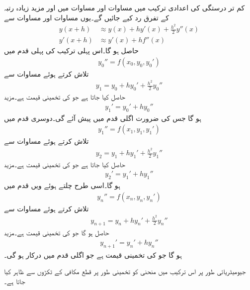 کم تر درستگی کی اعدادی ترکیب میں مساوات  اور مساوات  میں   اور مزید زیادہ رتبہ کے تفرق رد کیے جائیں گے۔یوں مساوات  اور مساوات  سے
\begin{align*}
y(x+h) & \approx y(x)+hy'(x)+\tfrac{h^2}{2}y''(x)\\
y'(x+h)&\approx y'(x)+hf''(x)
\end{align*}
حاصل ہو گا۔اس پہلی ترکیب کی پہلی قدم میں
\begin{align*}
y_0''=f(x_0,y_0,y_0')
\end{align*}
تلاش کرتے ہوئے  مساوات  سے
\begin{align*}
y_1=y_0+hy_0'+\tfrac{h^2}{2}y_0''
\end{align*}
حاصل کیا جاتا ہے جو  کی تخمینی قیمت ہے۔مزید
\begin{align*}
y_1'=y_0'+hy_0''
\end{align*}
ہو گا جس کی ضرورت اگلی قدم میں پیش آئے گی۔دوسری قدم میں
\begin{align*}
y_1''=f(x_1,y_1,y_1')
\end{align*}
تلاش کرتے ہوئے مساوات  سے
\begin{align*}
y_2=y_1+hy_1'+\tfrac{h^2}{2}y_1''
\end{align*}
حاصل کیا جاتا ہے جو  کی تخمینی قیمت ہے۔مزید
\begin{align*}
y_2'=y_1'+hy_1''
\end{align*}
ہو گا۔اسی طرح چلتے ہوئے  ویں قدم میں 
\begin{align*}
y_n''=f(x_n,y_n,y_n')
\end{align*}
تلاش کرتے ہوئے مساوات  سے
\begin{align}\label{مساوات_اعدادی_دو_درجی_پہلی_الف}
y_{n+1}=y_n+hy_n'+\tfrac{h^2}{2}y_n''
\end{align}
حاصل ہو گا جو  کی تخمینی قیمت ہے۔مزید
\begin{align}\label{مساوات_اعدادی_دو_درجی_پہلی_ب}
y_{n+1}'=y_n'+hy_n''
\end{align}
ہو گا جو  کی تخمینی قیمت ہے جو  اگلی قدم میں درکار ہو گی۔

جیومیٹریائی طور پر اس ترکیب میں منحنی  کو  تخمینی طور پر قطع مکافی کے ٹکڑوں سے ظاہر کیا جاتا ہے۔  

